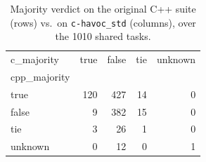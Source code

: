 \begin{table}[t]
  \centering
  \caption{Majority verdict on the original C++ suite (rows) vs.\ on \texttt{c-havoc_std} (columns), over the 1010 shared tasks.}
  \label{tab:dual-majority-c-havoc_std}
\begin{tabular}{lrrrr}
\toprule
c_majority & true & false & tie & unknown \\
cpp_majority &  &  &  &  \\
\midrule
true & 120 & 427 & 14 & 0 \\
false & 9 & 382 & 15 & 0 \\
tie & 3 & 26 & 1 & 0 \\
unknown & 0 & 12 & 0 & 1 \\
\bottomrule
\end{tabular}
\end{table}
